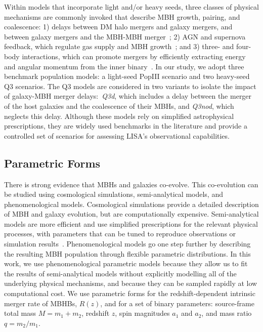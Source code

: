 \documentclass[a4paper,12pt]{article}
\begin{document}
Within models that incorporate light and/or heavy seeds, three classes of physical mechanisms are commonly invoked that describe MBH growth, pairing, and coalescence: 1) delays between DM halo mergers and galaxy mergers, and between galaxy mergers and the MBH-MBH merger~\cite{antonini2015coevolution,antonini2015imprint}; 2) AGN and supernova feedback, which regulate gas supply and MBH growth~\cite{barausse2020massive,barausse2012evolution,barausse2014erratum}; and 3) three- and four-body interactions, which can promote mergers by efficiently extracting energy and angular momentum from the inner binary~\cite{bonetti2016post,bonetti2018post}. In our study, we adopt three benchmark population models: a light-seed PopIII scenario and two heavy-seed Q3 scenarios. 
The Q3 models are considered in two variants to isolate the impact of galaxy-MBH merger delays:~\textit{Q3d}, which includes a delay between the merger of the host galaxies and the coalescence of their MBHs, and \textit{Q3nod}, which neglects this delay. Although these models rely on simplified astrophysical prescriptions, they are widely used benchmarks in the literature and provide a controlled set of scenarios for assessing LISA's observational capabilities. 

\FloatBarrier
\subsection{Parametric Forms}
\label{subsec:parametricforms}

There is strong evidence that MBHs and galaxies co-evolve. This co-evolution can be studied using cosmological simulations, semi-analytical models, and phenomenological models\cite{kormendy2013coevolution,somerville2015physical,somerville1999semi,sijacki2009growing}. Cosmological simulations provide a detailed description of MBH and galaxy evolution, but are computationally expensive. Semi-analytical models are more efficient and use simplified prescriptions for the relevant physical processes, with parameters that can be tuned to reproduce observations or simulation results~\cite{somerville1999semi,somerville2015physical}. Phenomenological models go one step further by describing the resulting MBH population through flexible parametric distributions. In this work, we use phenomenological parametric models because they allow us to fit the results of semi-analytical models without explicitly modelling all of the underlying physical mechanisms, and because they can be sampled rapidly at low computational cost. We use parametric forms for the redshift-dependent intrinsic merger rate of MBHBs, $R(z)$, and for a set of binary parameters: source-frame total mass $M = m_{1} + m_{2}$, redshift $z$, spin magnitudes $a_1$ and $a_2$, and mass ratio $q = m_2/m_1$. 
\\
\end{document}
